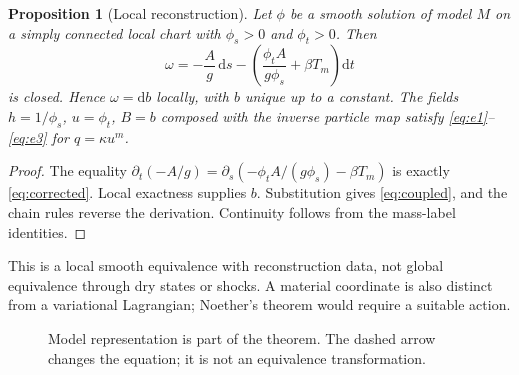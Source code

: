 \documentclass[11pt,a4paper,oneside]{report}
\numberwithin{equation}{chapter}
\newtheorem{proposition}[theorem]{Proposition}
\newcommand{\dd}{\mathrm d}
\begin{document}
\begin{proposition}[Local reconstruction]\label{prop:reconstruct}
Let $\phi$ be a smooth solution of model $M$ on a simply connected local chart with $\phi_s>0$ and $\phi_t>0$. Then
\begin{equation}\label{eq:bedform}
\omega=-\frac{A}{g}\,\dd s-
\left(\frac{\phi_tA}{g\phi_s}+\beta T_m\right)\dd t
\end{equation}
is closed. Hence $\omega=\dd b$ locally, with $b$ unique up to a constant. The fields $h=1/\phi_s$, $u=\phi_t$, $B=b$ composed with the inverse particle map satisfy \eqref{eq:e1}--\eqref{eq:e3} for $q=\kappa u^m$.
\end{proposition}
\begin{proof}
The equality $\partial_t(-A/g)=\partial_s(-\phi_tA/(g\phi_s)-\beta T_m)$ is exactly \eqref{eq:corrected}. Local exactness supplies $b$. Substitution gives \eqref{eq:coupled}, and the chain rules reverse the derivation. Continuity follows from the mass-label identities.\end{proof}
This is a local smooth equivalence with reconstruction data, not global equivalence through dry states or shocks. A material coordinate is also distinct from a variational Lagrangian; Noether's theorem would require a suitable action.

\begin{figure}[htbp]\centering
{}
\caption{Model representation is part of the theorem. The dashed arrow changes the equation; it is not an equivalence transformation.}\label{fig:models}
\end{figure}
\end{document}
